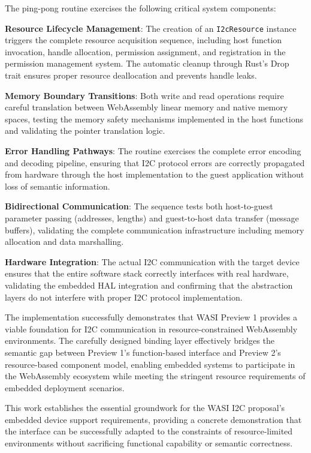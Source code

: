 The ping-pong routine exercises the following critical system components:

\textbf{Resource Lifecycle Management}: The creation of an \texttt{I2cResource} instance triggers the complete resource acquisition sequence, including host function invocation, handle allocation, permission assignment, and registration in the permission management system. The automatic cleanup through Rust's Drop trait ensures proper resource deallocation and prevents handle leaks.

\textbf{Memory Boundary Transitions}: Both write and read operations require careful translation between WebAssembly linear memory and native memory spaces, testing the memory safety mechanisms implemented in the host functions and validating the pointer translation logic.

\textbf{Error Handling Pathways}: The routine exercises the complete error encoding and decoding pipeline, ensuring that I2C protocol errors are correctly propagated from hardware through the host implementation to the guest application without loss of semantic information.

\textbf{Bidirectional Communication}: The sequence tests both host-to-guest parameter passing (addresses, lengths) and guest-to-host data transfer (message buffers), validating the complete communication infrastructure including memory allocation and data marshalling.

\textbf{Hardware Integration}: The actual I2C communication with the target device ensures that the entire software stack correctly interfaces with real hardware, validating the embedded HAL integration and confirming that the abstraction layers do not interfere with proper I2C protocol implementation.

The implementation successfully demonstrates that WASI Preview 1 provides a viable foundation for I2C communication in resource-constrained WebAssembly environments. The carefully designed binding layer effectively bridges the semantic gap between Preview 1's function-based interface and Preview 2's resource-based component model, enabling embedded systems to participate in the WebAssembly ecosystem while meeting the stringent resource requirements of embedded deployment scenarios.

This work establishes the essential groundwork for the WASI I2C proposal's embedded device support requirements, providing a concrete demonstration that the interface can be successfully adapted to the constraints of resource-limited environments without sacrificing functional capability or semantic correctness.